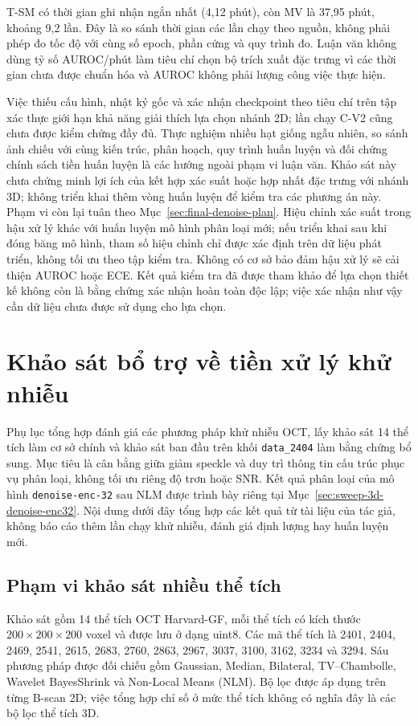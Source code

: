 \documentclass[14pt,a4paper,oneside]{extreport}
\begin{document}
T-SM có thời gian ghi nhận ngắn nhất (4,12 phút), còn MV là 37,95 phút,
khoảng 9,2 lần. Đây là so sánh thời gian các lần chạy theo nguồn, không phải
phép đo tốc độ với cùng số epoch, phần cứng và quy trình đo. Luận văn
không dùng tỷ số AUROC/phút làm tiêu chí chọn bộ trích xuất đặc trưng vì các thời gian
chưa được chuẩn hóa và AUROC không phải lượng công việc thực hiện.

Việc thiếu cấu hình, nhật ký gốc và xác nhận checkpoint theo tiêu chí trên
tập xác thực giới hạn khả năng giải thích lựa chọn nhánh 2D; lần chạy C-V2
cũng chưa được kiểm chứng đầy đủ. Thực nghiệm nhiều hạt giống ngẫu nhiên,
so sánh ảnh chiếu với cùng kiến trúc, phân hoạch, quy trình huấn luyện và
đối chứng chính sách tiền huấn luyện là các hướng ngoài phạm vi luận văn.
Khảo sát này chưa chứng minh lợi ích của kết hợp xác suất hoặc hợp nhất
đặc trưng với nhánh 3D; không triển khai thêm vòng huấn luyện để kiểm tra
các phương án này. Phạm vi còn lại tuân theo Mục~\ref{sec:final-denoise-plan}.
Hiệu chỉnh xác suất trong hậu xử lý khác với huấn luyện mô hình phân loại
mới; nếu triển khai sau khi đóng băng mô hình, tham số hiệu chỉnh chỉ được
xác định trên dữ liệu phát triển, không tối ưu theo tập kiểm tra. Không có
cơ sở bảo đảm hậu xử lý sẽ cải thiện AUROC hoặc ECE. Kết quả kiểm tra đã
được tham khảo để lựa chọn thiết kế không còn là bằng chứng xác nhận hoàn
toàn độc lập; việc xác nhận như vậy cần dữ liệu chưa được sử dụng cho lựa chọn.



\chapter{Khảo sát bổ trợ về tiền xử lý khử nhiễu}
\label{app:denoise-support}
\label{sec:auxiliary-denoise-results}
Phụ lục tổng hợp đánh giá các phương pháp khử nhiễu OCT, lấy khảo
sát 14 thể tích làm cơ sở chính và khảo sát ban đầu trên khối
\texttt{data\_2404} làm bằng chứng bổ sung. Mục tiêu là cân bằng
giữa giảm speckle và duy trì thông tin cấu trúc phục vụ phân loại,
không tối ưu riêng độ trơn hoặc SNR. Kết quả phân loại của mô hình
\texttt{denoise-enc-32} sau NLM được trình bày riêng tại
Mục~\ref{sec:sweep-3d-denoise-enc32}. Nội dung dưới đây tổng hợp các
kết quả từ tài liệu của tác giả, không báo cáo thêm lần chạy khử nhiễu,
đánh giá định lượng hay huấn luyện mới.

\section{Phạm vi khảo sát nhiều thể tích}
\label{sec:denoise-14-scope}
Khảo sát gồm 14 thể tích OCT Harvard-GF, mỗi thể tích có kích thước
$200\times200\times200$ voxel và được lưu ở dạng uint8. Các mã thể
tích là 2401, 2404, 2469, 2541, 2615, 2683, 2760, 2863, 2967,
3037, 3100, 3162, 3234 và 3294. Sáu phương pháp được đối chiếu gồm
Gaussian, Median, Bilateral, TV--Chambolle, Wavelet BayesShrink và
Non-Local Means (NLM). Bộ lọc được áp dụng trên từng B-scan 2D;
việc tổng hợp chỉ số ở mức thể tích không có nghĩa đây là các bộ
lọc thể tích 3D.
\end{document}
